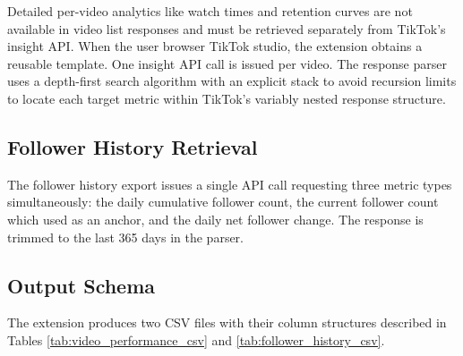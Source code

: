 Detailed per-video analytics like watch times and retention curves are not available in video list responses and must be retrieved separately from TikTok's insight API. When the user browser TikTok studio, the extension obtains a reusable template. One insight API call is issued per video. The response parser uses a depth-first search algorithm with an explicit stack to avoid recursion limits to locate each target metric within TikTok's variably nested response structure.

\subsection{Follower History Retrieval}

The follower history export issues a single API call requesting three metric types simultaneously: the daily cumulative follower count, the current follower count which used as an anchor, and the daily net follower change. The response is trimmed to the last 365 days in the parser.

\subsection{Output Schema}

The extension produces two CSV files with their column structures described in Tables \ref{tab:video_performance_csv} and \ref{tab:follower_history_csv}.


